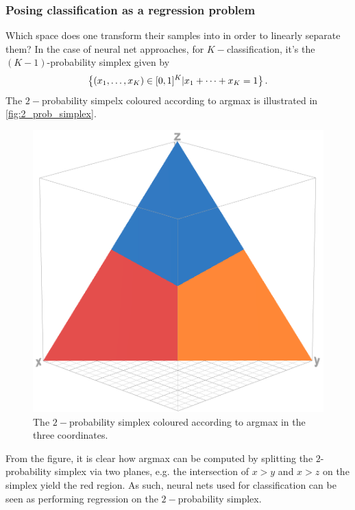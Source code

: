 \documentclass[11pt]{article}
\begin{document}
\subsubsection{Posing classification as a regression problem}
Which space does one transform their samples into in order to linearly separate them? In the case of neural net approaches, for $K-$classification, it's the $(K-1)$-probability simplex given by
$$
\left\{(x_1,\dots,x_K)\in[0,1]^K|x_1+\dots+x_K=1\right\}.
$$
The $2-$probability simpelx coloured according to argmax is illustrated in \autoref{fig:2_prob_simplex}.
\begin{figure}[t]
    \centering
    \begin{minipage}{0.52\linewidth}
        \includegraphics[width=1\textwidth]{./figures/neural_nets/MLP_simplex_argmax.png}
    \end{minipage}%
    \hfill
    \begin{minipage}{0.48\linewidth}
        \caption{The $2-$probability simplex coloured according to argmax in the three coordinates.}
        \label{fig:2_prob_simplex}
    \end{minipage}
\end{figure}
From the figure, it is clear how argmax can be computed by splitting the $2$-probability simplex via two planes, e.g. the intersection of $x>y$ and $x>z$ on the simplex yield the red region. As such, neural nets used for classification can be seen as performing regression on the $2-$probability simplex.
\end{document}
